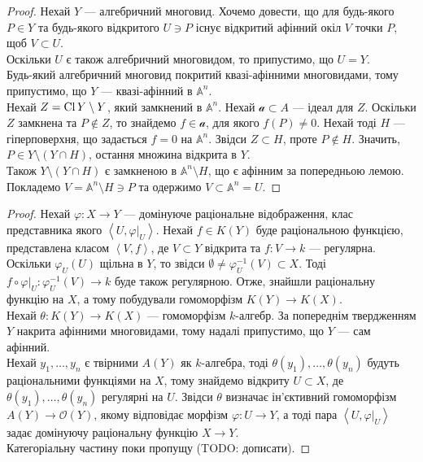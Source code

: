 \documentclass{math_library}
\begin{document}
\begin{proof}
Нехай $Y$ --- алгебричний многовид. Хочемо довести, що для будь-якого $P \in Y$ та будь-якого відкритого $U \ni P$ існує відкритий афінний окіл $V$ точки $P$, щоб $V \subset U$.\\
Оскільки $U$ є також алгебричний многовидом, то припустимо, що $U = Y$.\\
Будь-який алгебричний многовид покритий квазі-афінними многовидами, тому припустимо, що $Y$ --- квазі-афінний в $\mathbb{A}^n$.\\
Нехай $Z = \operatorname{Cl} Y \setminus Y$, який замкнений в $\mathbb{A}^n$. Нехай $\mathcal{a} \subset A$ --- ідеал для $Z$. Оскільки $Z$ замкнена та $P \notin Z$, то знайдемо $f \in \mathcal{a}$, для якого $f(P) \neq 0$. Нехай тоді $H$ --- гіперповерхня, що задається $f = 0$ на $\mathbb{A}^n$. Звідси $Z \subset H$, проте $P \notin H$. Значить, $P \in Y \setminus (Y \cap H)$, остання множина відкрита в $Y$.\\
Також $Y \setminus (Y \cap H)$ є замкненою в $\mathbb{A}^n \setminus H$, що є афінним за попередньою лемою. Покладемо $V = \mathbb{A}^n \setminus H \ni P$ та одержимо $V \subset \mathbb{A}^n = U$. 
\end{proof}

\begin{proof}
\rightproof Нехай $\varphi \colon X \to Y$ --- домінуюче раціональне відображення, клас представника якого $\left<U, \varphi|_U\right>$. Нехай $f \in K(Y)$ буде раціональною функцією, представлена класом $\left<V,f\right>$, де $V \subset Y$ відкрита та $f \colon V \to k$ --- регулярна. Оскільки $\varphi_U(U)$ щільна в $Y$, то звідси $\emptyset \neq \varphi^{-1}_U(V) \subset X$. Тоді $f \circ \varphi|_U \colon \varphi_U^{-1}(V) \to k$ буде також регулярною. Отже, знайшли раціональну функцію на $X$, а тому побудували гомоморфізм $K(Y) \to K(X)$.
\bigskip \\
\leftproof Нехай $\theta \colon K(Y) \to K(X)$ --- гомоморфізм $k$-алгебр. За попереднім твердженням $Y$ накрита афінними многовидами, тому надалі припустимо, що $Y$ --- сам афінний.\\
Нехай $y_1,\dots,y_n$ є твірними $A(Y)$ як $k$-алгебра, тоді $\theta(y_1),\dots,\theta(y_n)$ будуть раціональними функціями на $X$, тому знайдемо відкриту $U \subset X$, де $\theta(y_1),\dots,\theta(y_n)$ регулярні на $U$. Звідси $\theta$ визначає ін'єктивний гомоморфізм $A(Y) \to \mathcal{O}(Y)$, якому відповідає морфізм $\varphi \colon U \to Y$, а тоді пара $\left<U,\varphi|_U\right>$ задає домінуючу раціональну функцію $X \to Y$.
\bigskip \\
Категоріальну частину поки пропущу (TODO: дописати).
\end{proof}
\end{document}
